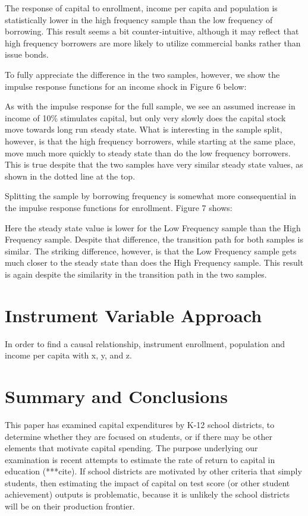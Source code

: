 \clearpage

The response of capital to enrollment, income per capita and population is statistically lower in the high frequency sample than the low frequency of borrowing. This result seems a bit counter-intuitive, although it may reflect that high frequency borrowers are more likely to utilize commercial banks rather than issue bonds. 

To fully appreciate the difference in the two samples, however, we show the impulse response functions for an income shock in Figure 6 below:

As with the impulse response for the full sample, we see an assumed increase in income of 10\% stimulates capital, but only very slowly does the capital stock move towards long run steady state. What is interesting in the sample split, however, is that the high frequency borrowers, while starting at the same place, move much more quickly to steady state than do the low frequency borrowers. This is true despite that the two samples have very similar steady state values, as shown in the dotted line at the top.

Splitting the sample by borrowing frequency is somewhat more consequential in the impulse response functions for enrollment. Figure 7 shows:

Here the steady state value is lower for the Low Frequency sample than the High Frequency sample. Despite that difference, the transition path for both samples is similar. The striking difference, however, is that the Low Frequency sample gets much closer to the steady state than does the High Frequency sample. This result is again despite the similarity in the transition path in the two samples.

\section{Instrument Variable Approach}

In order to find a causal relationship, instrument enrollment, population and income per capita with x, y, and z.

\section{Summary and Conclusions}

This paper has examined capital expenditures by K-12 school districts, to determine whether they are focused on students, or if there may be other elements that motivate capital spending. The purpose underlying our examination is recent attempts to estimate the rate of return to capital in education (***cite). If school districts are motivated by other criteria that simply students, then estimating the impact of capital on test score (or other student achievement) outputs is problematic, because it is unlikely the school districts will be on their production frontier.

